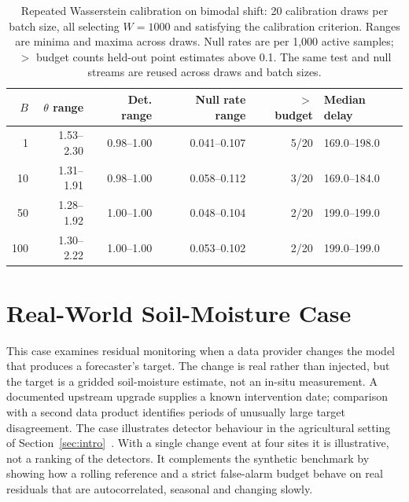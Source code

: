 \documentclass[preprint,12pt]{elsarticle}
\begin{document}
\begin{table}[htbp]\centering\small
\caption{Repeated Wasserstein calibration on bimodal shift: 20 calibration draws per batch size, all selecting $W=1000$ and satisfying the calibration criterion. Ranges are minima and maxima across draws. Null rates are per 1,000 active samples; $>$ budget counts held-out point estimates above 0.1. The same test and null streams are reused across draws and batch sizes.}\label{tab:batch-robust}
\setlength{\tabcolsep}{4pt}\begin{tabular}{rrrrrl}
\toprule
$B$ & $\theta$ range & Det. range & Null rate range & $>$ budget & Median delay\\\midrule
1 & 1.53--2.30 & 0.98--1.00 & 0.041--0.107 & 5/20 & 169.0--198.0\\
10 & 1.31--1.91 & 0.98--1.00 & 0.058--0.112 & 3/20 & 169.0--184.0\\
50 & 1.28--1.92 & 1.00--1.00 & 0.048--0.104 & 2/20 & 199.0--199.0\\
100 & 1.30--2.22 & 1.00--1.00 & 0.053--0.102 & 2/20 & 199.0--199.0\\
\bottomrule\end{tabular}\end{table}

\section{Real-World Soil-Moisture Case}
\label{sec:soil}
This case examines residual monitoring when a data provider changes the model that produces a forecaster's target. The change is real rather than injected, but the target is a gridded soil-moisture estimate, not an in-situ measurement. A documented upstream upgrade supplies a known intervention date; comparison with a second data product identifies periods of unusually large target disagreement. The case illustrates detector behaviour in the agricultural setting of Section~\ref{sec:intro}~\cite{grazieschi2025soilcast}. With a single change event at four sites it is illustrative, not a ranking of the detectors. It complements the synthetic benchmark by showing how a rolling reference and a strict false-alarm budget behave on real residuals that are autocorrelated, seasonal and changing slowly.
\end{document}
